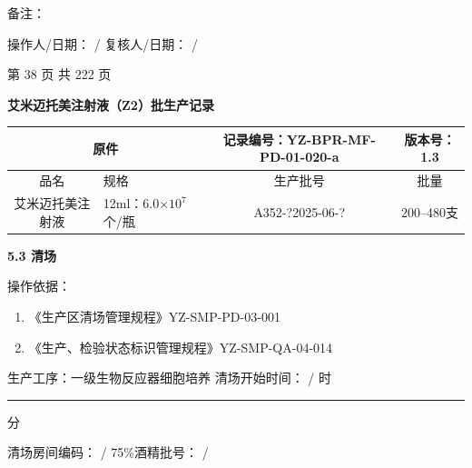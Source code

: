 \documentclass[UTF8,10pt,a4paper,fontset=fandol]{ctexart}
\newcommand{\fieldvalue}[1]{#1}
\newcommand{\handwritten}[1]{#1}
\begin{document}
备注：\hrulefill

\vspace{8pt}

操作人/日期：
\fieldvalue{\handwritten{/}}
\hfill
复核人/日期：
\fieldvalue{\handwritten{/}}

\vfill

\begin{center}
{\tiny 第 38 页 共 222 页}
\end{center}

\newpage

\begin{center}
\textbf{\Large 艾米迈托美注射液（Z2）批生产记录}
\end{center}

\noindent
\begin{tabularx}{\textwidth}{|c|X|c|c|}
\hline
\multicolumn{2}{|c|}{原件} & 记录编号：YZ-BPR-MF-PD-01-020-a & 版本号：1.3 \\
\hline
品名 & 规格 & 生产批号 & 批量 \\
\hline
艾米迈托美注射液 & 12ml：6.0$\times 10^{7}$个/瓶 &
\fieldvalue{\handwritten{A352-?2025-06-?}} &
200--480支 \\
\hline
\end{tabularx}

\noindent\textbf{5.3 清场}

\medskip
\noindent 操作依据：

\begin{enumerate}
  \item 《生产区清场管理规程》\hfill YZ-SMP-PD-03-001
  \item 《生产、检验状态标识管理规程》\hfill YZ-SMP-QA-04-014
\end{enumerate}

\noindent
生产工序：一级生物反应器细胞培养
\hfill
清场开始时间：
\fieldvalue{\handwritten{/}} 时 \rule{1.2em}{0.4pt} 分

\medskip
\noindent
清场房间编码：
\fieldvalue{\handwritten{/}}
\hfill
75\%酒精批号：
\fieldvalue{\handwritten{/}}
\end{document}
